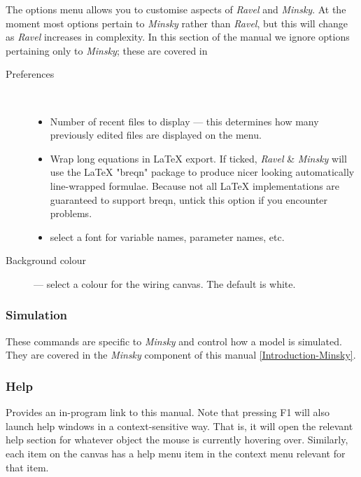 The options menu allows you to customise aspects of \emph{Ravel} and
\emph{Minsky}. At the moment most options pertain to \emph{Minsky}
rather than \emph{Ravel}, but this will change as \emph{Ravel} increases
in complexity. In this section of the manual we ignore options pertaining
only to \emph{Minsky}; these are covered in 
\begin{description}
\item [{Preferences}] %
\mbox{%
%
}
\begin{itemize}
\item Number of recent files to display --- this determines how many previously
edited files are displayed on the 
menu. 
\item \label{wrap-equations} Wrap long equations in LaTeX export. If ticked,
\emph{Ravel} \& \emph{Minsky} will use the LaTeX "breqn" package
to produce nicer looking automatically line-wrapped formulae. Because
not all LaTeX implementations are guaranteed to support breqn, untick
this option if you encounter problems. 
\item \label{font} select a font for variable names, parameter names, etc. 
\end{itemize}
\item [{Background colour}] --- select a colour for the wiring canvas.
The default is white.
\end{description}

\subsubsection{Simulation}

These commands are specific to \emph{Minsky} and control how a model
is simulated. They are covered in the \emph{Minsky} component of this
manual \ref{Introduction-Minsky}. 

\subsubsection{Help}

\label{Help}

Provides an in-program link to this manual. Note that pressing F1
will also launch help windows in a context-sensitive way. That is,
it will open the relevant help section for whatever object the mouse
is currently hovering over. Similarly, each item on the canvas has
a help menu item in the context menu relevant for that item.

